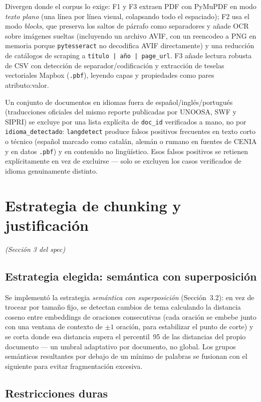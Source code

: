 \documentclass[11pt]{article}
\newcommand{\codigo}[1]{\texttt{\small #1}}
\newcommand{\seccionspec}[1]{\textit{(Sección #1 del spec)}}
\begin{document}
Divergen donde el corpus lo exige: F1 y F3 extraen PDF con PyMuPDF en modo
\emph{texto plano} (una línea por línea visual, colapsando todo el
espaciado); F2 usa el modo \emph{blocks}, que preserva los saltos de párrafo
como separadores y añade OCR sobre imágenes sueltas (incluyendo un archivo
AVIF, con un reencodeo a PNG en memoria porque \codigo{pytesseract} no
decodifica AVIF directamente) y una reducción de catálogos de scraping a
\codigo{título | año | page\_url}. F3 añade lectura robusta de CSV con
detección de separador/codificación y extracción de teselas vectoriales
Mapbox (\codigo{.pbf}), leyendo capas y propiedades como pares
atributo:valor.

Un conjunto de documentos en idiomas fuera de español/inglés/portugués
(traducciones oficiales del mismo reporte publicadas por UNOOSA, SWF y SIPRI)
se excluye por una lista explícita de \codigo{doc\_id} verificados a mano, no
por \codigo{idioma\_detectado}: \codigo{langdetect} produce falsos positivos
frecuentes en texto corto o técnico (español marcado como catalán, alemán o
rumano en fuentes de CENIA y en datos \codigo{.pbf}) y en contenido no
lingüístico. Esos falsos positivos se retienen explícitamente en vez de
excluirse --- solo se excluyen los casos verificados de idioma genuinamente
distinto.

\section{Estrategia de chunking y justificación}
\seccionspec{3}

\subsection{Estrategia elegida: semántica con superposición}

Se implementó la estrategia \emph{semántica con superposición} (Sección~3.2):
en vez de trocear por tamaño fijo, se detectan cambios de tema calculando la
distancia coseno entre embeddings de oraciones consecutivas (cada oración se
embebe junto con una ventana de contexto de $\pm1$ oración, para estabilizar
el punto de corte) y se corta donde esa distancia supera el percentil~95 de
las distancias del propio documento --- un umbral adaptativo por documento, no
global. Los grupos semánticos resultantes por debajo de un mínimo de palabras
se fusionan con el siguiente para evitar fragmentación excesiva.

\subsection{Restricciones duras}
\end{document}
